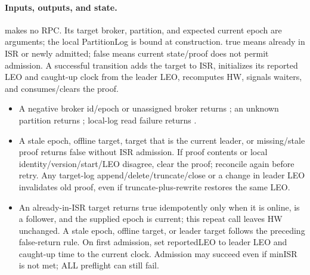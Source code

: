 \paragraph{Inputs, outputs, and state.} makes no RPC. Its target broker, partition, and expected current epoch are arguments; the local PartitionLog is bound at construction. true means already in ISR or newly admitted; false means current state/proof does not permit admission. A successful transition adds the target to ISR, initializes its reported LEO and caught-up clock from the leader LEO, recomputes HW, signals waiters, and consumes/clears the proof.
\begin{itemize}
\item A negative broker id/epoch or unassigned broker returns ; an unknown partition returns ; local-log read failure returns .
\item A stale epoch, offline target, target that is the current leader, or missing/stale proof returns false without ISR admission. If proof contents or local identity/version/start/LEO disagree, clear the proof; reconcile again before retry. Any target-log append/delete/truncate/close or a change in leader LEO invalidates old proof, even if truncate-plus-rewrite restores the same LEO.
\item An already-in-ISR target returns true idempotently only when it is online, is a follower, and the supplied epoch is current; this repeat call leaves HW unchanged. A stale epoch, offline target, or leader target follows the preceding false-return rule. On first admission, set reportedLEO to leader LEO and caught-up time to the current clock. Admission may succeed even if minISR is not met; ALL preflight can still fail.
\end{itemize}
